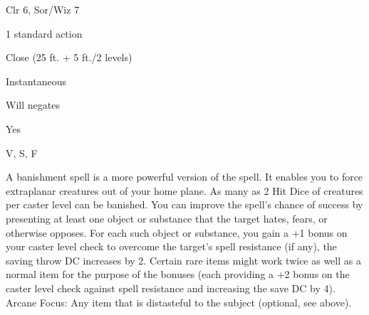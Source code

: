 
\begin{description*}
\item[Level:] Clr 6, Sor/Wiz 7
\item[Casting Time:] 1 standard action
\item[Range:] Close (25 ft. + 5 ft./2 levels)
\item[Duration:] Instantaneous
\item[Saving Throw:] Will negates
\item[Spell Resistance:] Yes
\item[Components:] V, S, F
\end{description*}

A banishment spell is a more powerful version of the 
spell. It enables you to force extraplanar creatures out of your home plane. As
many as 2 Hit Dice of creatures per caster level can be banished.
You can improve the spell's chance of success by presenting at least one object
or substance that the target hates, fears, or otherwise opposes. For each such
object or substance, you gain a +1 bonus on your caster level check to overcome
the target's spell resistance (if any), the saving throw DC increases by 2.
Certain rare items might work twice as well as a normal item for the purpose of
the bonuses (each providing a +2 bonus on the caster level check against spell
resistance and increasing the save DC by 4).
Arcane Focus: Any item that is distasteful to the subject (optional, see above).